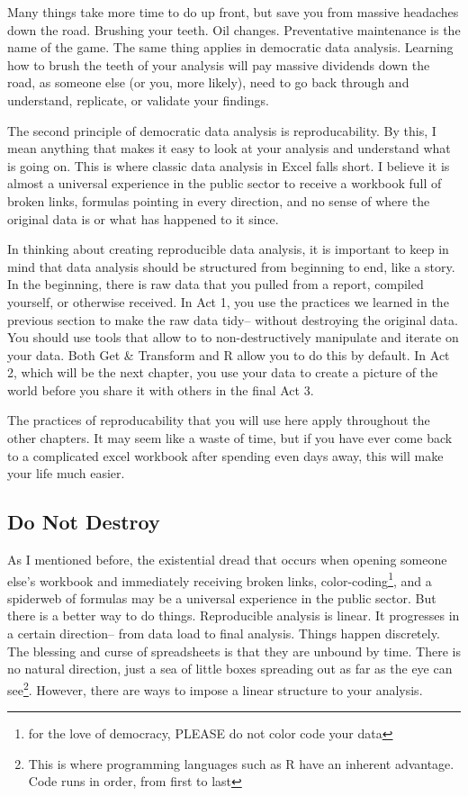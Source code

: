 \documentclass[]{book}
\begin{document}
Many things take more time to do up front, but save you from massive headaches down the road. Brushing your teeth. Oil changes. Preventative maintenance is the name of the game. The same thing applies in democratic data analysis. Learning how to brush the teeth of your analysis will pay massive dividends down the road, as someone else (or you, more likely), need to go back through and understand, replicate, or validate your findings.

The second principle of democratic data analysis is reproducability. By this, I mean anything that makes it easy to look at your analysis and understand what is going on. This is where classic data analysis in Excel falls short. I believe it is almost a universal experience in the public sector to receive a workbook full of broken links, formulas pointing in every direction, and no sense of where the original data is or what has happened to it since.

In thinking about creating reproducible data analysis, it is important to keep in mind that data analysis should be structured from beginning to end, like a story. In the beginning, there is raw data that you pulled from a report, compiled yourself, or otherwise received. In Act 1, you use the practices we learned in the previous section to make the raw data tidy-- without destroying the original data. You should use tools that allow to to non-destructively manipulate and iterate on your data. Both Get \& Transform and R allow you to do this by default. In Act 2, which will be the next chapter, you use your data to create a picture of the world before you share it with others in the final Act 3.

The practices of reproducability that you will use here apply throughout the other chapters. It may seem like a waste of time, but if you have ever come back to a complicated excel workbook after spending even days away, this will make your life much easier.

\hypertarget{do-not-destroy}{%
\subsection{Do Not Destroy}\label{do-not-destroy}}

As I mentioned before, the existential dread that occurs when opening someone else's workbook and immediately receiving broken links, color-coding\footnote{for the love of democracy, PLEASE do not color code your data}, and a spiderweb of formulas may be a universal experience in the public sector. But there is a better way to do things. Reproducible analysis is linear. It progresses in a certain direction-- from data load to final analysis. Things happen discretely. The blessing and curse of spreadsheets is that they are unbound by time. There is no natural direction, just a sea of little boxes spreading out as far as the eye can see\footnote{This is where programming languages such as R have an inherent advantage. Code runs in order, from first to last}. However, there are ways to impose a linear structure to your analysis.
\end{document}
